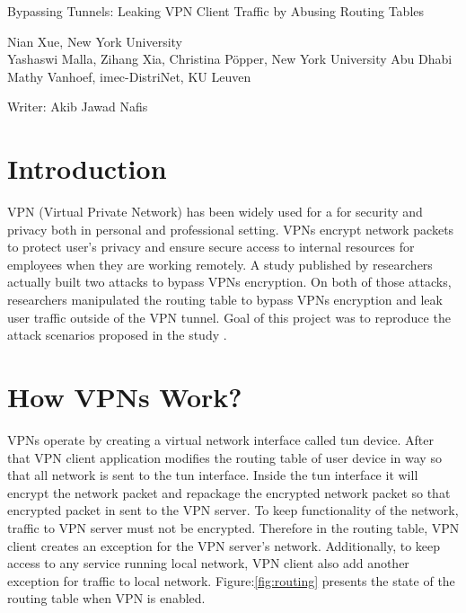 \documentclass[letterpaper,11pt]{article}
\newcommand{\fig}{Figure:}
\begin{document}
\begin{center}
{\Large Bypassing Tunnels: Leaking VPN Client Traffic by Abusing Routing Tables} 

{Nian Xue, New York University \\
Yashaswi Malla, Zihang Xia, Christina Pöpper, New York University Abu Dhabi\\
Mathy Vanhoef, imec-DistriNet, KU Leuven}
\bigskip

{\large Writer: Akib Jawad Nafis}
\date{\today}
\end{center}


%
%
%
%
%
%

\section{Introduction}
VPN (Virtual Private Network) has been widely used for a for security and privacy both in personal and professional setting.
VPNs encrypt network packets to protect user's privacy and
ensure secure access to internal resources for employees when they are working remotely.
A study \cite{vpnleaks} published by researchers actually built two attacks to bypass VPNs encryption.
On both of those attacks, researchers manipulated the routing table to bypass VPNs encryption and
leak user traffic outside of the VPN tunnel.
Goal of this project was to reproduce the attack scenarios proposed in the study \cite{vpnleaks}.

\section{How VPNs Work?}
VPNs operate by creating a virtual network interface called tun device.
After that VPN client application modifies the routing table of user device in way so that all network is sent to the tun interface.
Inside the tun interface it will encrypt the network packet and repackage the encrypted network packet
so that encrypted packet in sent to the VPN server. 
To keep functionality of the network, traffic to VPN server must not be encrypted. 
Therefore in the routing table, VPN client creates an exception for the VPN server's network.
Additionally, to keep access to any service running local network, VPN client also add another exception for traffic to local network.
\fig \ref{fig:routing} presents the state of the routing table when VPN is enabled.
\end{document}
